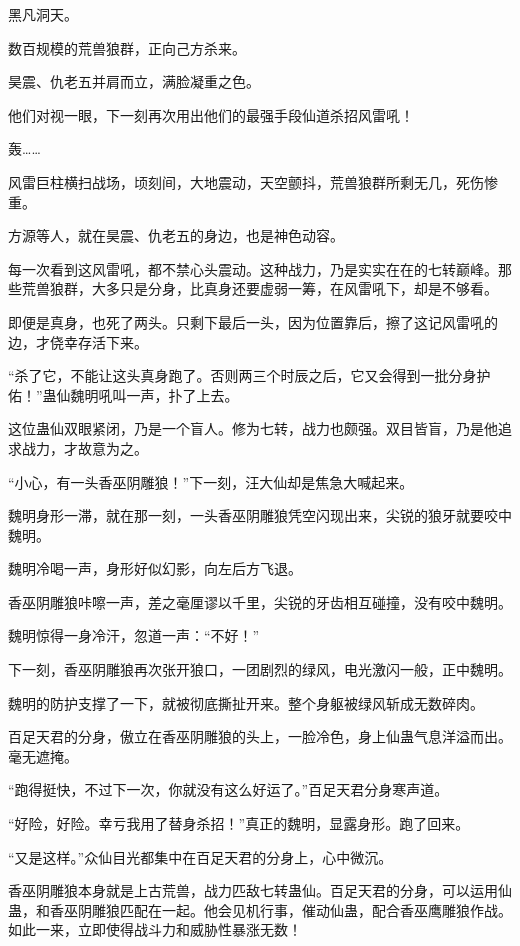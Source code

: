 
\begin{this_body}

黑凡洞天。

数百规模的荒兽狼群，正向己方杀来。

昊震、仇老五并肩而立，满脸凝重之色。

他们对视一眼，下一刻再次用出他们的最强手段仙道杀招风雷吼！

轰……

风雷巨柱横扫战场，顷刻间，大地震动，天空颤抖，荒兽狼群所剩无几，死伤惨重。

方源等人，就在昊震、仇老五的身边，也是神色动容。

每一次看到这风雷吼，都不禁心头震动。这种战力，乃是实实在在的七转巅峰。那些荒兽狼群，大多只是分身，比真身还要虚弱一筹，在风雷吼下，却是不够看。

即便是真身，也死了两头。只剩下最后一头，因为位置靠后，擦了这记风雷吼的边，才侥幸存活下来。

“杀了它，不能让这头真身跑了。否则两三个时辰之后，它又会得到一批分身护佑！”蛊仙魏明吼叫一声，扑了上去。

这位蛊仙双眼紧闭，乃是一个盲人。修为七转，战力也颇强。双目皆盲，乃是他追求战力，才故意为之。

“小心，有一头香巫阴雕狼！”下一刻，汪大仙却是焦急大喊起来。

魏明身形一滞，就在那一刻，一头香巫阴雕狼凭空闪现出来，尖锐的狼牙就要咬中魏明。

魏明冷喝一声，身形好似幻影，向左后方飞退。

香巫阴雕狼咔嚓一声，差之毫厘谬以千里，尖锐的牙齿相互碰撞，没有咬中魏明。

魏明惊得一身冷汗，忽道一声：“不好！”

下一刻，香巫阴雕狼再次张开狼口，一团剧烈的绿风，电光激闪一般，正中魏明。

魏明的防护支撑了一下，就被彻底撕扯开来。整个身躯被绿风斩成无数碎肉。

百足天君的分身，傲立在香巫阴雕狼的头上，一脸冷色，身上仙蛊气息洋溢而出。毫无遮掩。

“跑得挺快，不过下一次，你就没有这么好运了。”百足天君分身寒声道。

“好险，好险。幸亏我用了替身杀招！”真正的魏明，显露身形。跑了回来。

“又是这样。”众仙目光都集中在百足天君的分身上，心中微沉。

香巫阴雕狼本身就是上古荒兽，战力匹敌七转蛊仙。百足天君的分身，可以运用仙蛊，和香巫阴雕狼匹配在一起。他会见机行事，催动仙蛊，配合香巫鹰雕狼作战。如此一来，立即使得战斗力和威胁性暴涨无数！


\end{this_body}
